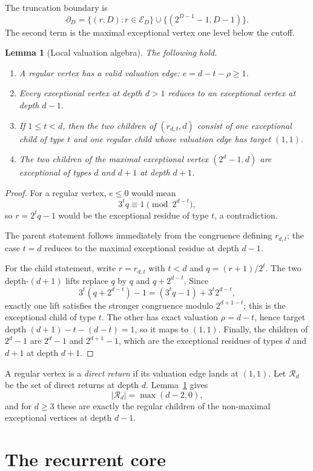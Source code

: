 \documentclass[11pt]{article}
\newtheorem{lemma}[theorem]{Lemma}
\theoremstyle{definition}
\theoremstyle{remark}
\newcommand{\Ecal}{\mathcal E}
\newcommand{\Rcal}{\mathcal R}
\newcommand{\bdD}{\partial_D}
\begin{document}
The truncation boundary is
\[
\bdD=\{(r,D):r\in\Ecal_D\}\cup\{(2^{D-1}-1,D-1)\}.
\]
The second term is the maximal exceptional vertex one level below the cutoff.

\begin{lemma}[Local valuation algebra]\label{lem:local}
The following hold.
\begin{enumerate}
\item A regular vertex has a valid valuation edge: $e=d-t-\rho\ge1$.
\item Every exceptional vertex at depth $d>1$ reduces to an exceptional vertex at depth $d-1$.
\item If $1\le t<d$, then the two children of $(r_{d,t},d)$ consist of one exceptional child of type $t$ and one regular child whose valuation edge has target $(1,1)$.
\item The two children of the maximal exceptional vertex $(2^d-1,d)$ are exceptional of types $d$ and $d+1$ at depth $d+1$.
\end{enumerate}
\end{lemma}

\begin{proof}
For a regular vertex, $e\le0$ would mean
\[
3^tq\equiv1\pmod {2^{d-t}},
\]
so $r=2^tq-1$ would be the exceptional residue of type $t$, a contradiction.

The parent statement follows immediately from the congruence defining $r_{d,t}$; the case $t=d$ reduces to the maximal exceptional residue at depth $d-1$.

For the child statement, write $r=r_{d,t}$ with $t<d$ and $q=(r+1)/2^t$.  The two depth-$(d+1)$ lifts replace $q$ by $q$ and $q+2^{d-t}$.  Since
\[
3^t(q+2^{d-t})-1=(3^tq-1)+3^t2^{d-t},
\]
exactly one lift satisfies the stronger congruence modulo $2^{d+1-t}$; this is the exceptional child of type $t$.  The other has exact valuation $\rho=d-t$, hence target depth $(d+1)-t-(d-t)=1$, so it maps to $(1,1)$.  Finally, the children of $2^d-1$ are $2^d-1$ and $2^{d+1}-1$, which are the exceptional residues of types $d$ and $d+1$ at depth $d+1$.
\end{proof}

A regular vertex is a \emph{direct return} if its valuation edge lands at $(1,1)$.  Let $\Rcal_d$ be the set of direct returns at depth $d$.  Lemma~\ref{lem:local} gives
\[
|\Rcal_d|=\max(d-2,0),
\]
and for $d\ge3$ these are exactly the regular children of the non-maximal exceptional vertices at depth $d-1$.

\section{The recurrent core}\label{sec:core}
\end{document}

